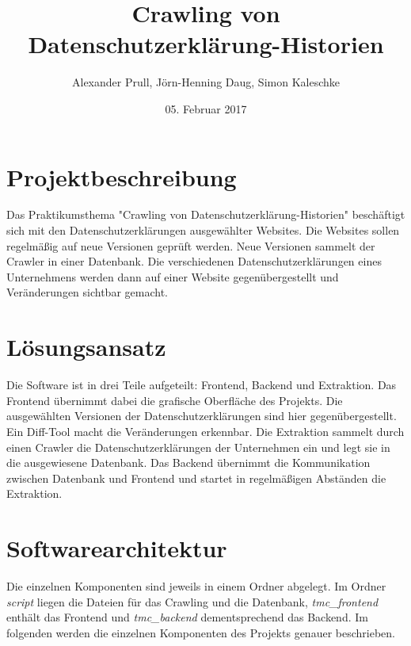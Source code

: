\documentclass{article}
\title{Crawling von Datenschutzerklärung-Historien}
\author{Alexander Prull, Jörn-Henning Daug, Simon Kaleschke}
\date{05. Februar 2017}
\begin{document}
	
	\maketitle
	
	\section{Projektbeschreibung}
	Das Praktikumsthema "Crawling von Datenschutzerklärung-Historien"{} beschäftigt sich mit den Datenschutzerklärungen ausgewählter Websites. Die Websites sollen regelmäßig auf neue Versionen geprüft werden. Neue Versionen sammelt der Crawler in einer Datenbank. Die verschiedenen Datenschutzerklärungen eines Unternehmens werden dann auf einer Website gegenübergestellt und Veränderungen sichtbar gemacht.
	\section{Lösungsansatz}
	Die Software ist in drei Teile aufgeteilt: Frontend, Backend und Extraktion. Das Frontend übernimmt dabei die grafische Oberfläche des Projekts. Die ausgewählten Versionen der Datenschutzerklärungen sind hier gegenübergestellt. Ein Diff-Tool macht die Veränderungen erkennbar.
	Die Extraktion sammelt durch einen Crawler die Datenschutzerklärungen der Unternehmen ein und legt sie in die ausgewiesene Datenbank.
	Das Backend übernimmt die Kommunikation zwischen Datenbank und Frontend und startet in regelmäßigen Abständen die Extraktion.
	\section{Softwarearchitektur}
	Die einzelnen Komponenten sind jeweils in einem Ordner abgelegt. Im Ordner \textit{script} liegen die Dateien für das Crawling und die Datenbank, \textit{tmc\_frontend} enthält das Frontend und \textit{tmc\_backend} dementsprechend das Backend.	
	Im folgenden werden die einzelnen Komponenten des Projekts genauer beschrieben.
	
\end{document}
